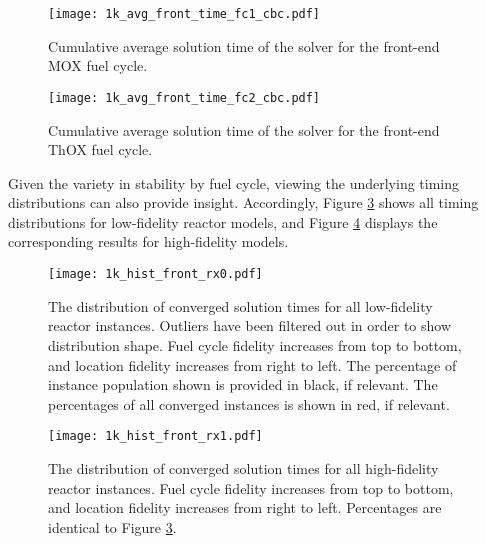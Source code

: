 \begin{figure}[h!]
  \begin{center}
    \texttt{[image: 1k\_avg\_front\_time\_fc1\_cbc.pdf]}
    \caption{
      \label{fig:1k_avg_front_time_fc1_cbc}
      Cumulative average solution time of the \cbc solver for the front-end MOX
      fuel cycle.}
  \end{center}
\end{figure}

\begin{figure}[h!]
  \begin{center}
    \texttt{[image: 1k\_avg\_front\_time\_fc2\_cbc.pdf]}
    \caption{
      \label{fig:1k_avg_front_time_fc2_cbc}
      Cumulative average solution time of the \cbc solver for the front-end ThOX
      fuel cycle.}
  \end{center}
\end{figure}

Given the variety in stability by fuel cycle, viewing the underlying timing
distributions can also provide insight. Accordingly, Figure
\ref{fig:1k_hist_front_rx0} shows all timing distributions for low-fidelity
reactor models, and Figure \ref{fig:1k_hist_front_rx1} displays the
corresponding results for high-fidelity models.

\begin{figure}[h!]
  \begin{center}
    \texttt{[image: 1k\_hist\_front\_rx0.pdf]}
    \caption{
      \label{fig:1k_hist_front_rx0}
      The distribution of converged solution times for all low-fidelity reactor
      instances. Outliers have been filtered out in order to show distribution
      shape. Fuel cycle fidelity increases from top to bottom, and location
      fidelity increases from right to left. The percentage of instance
      population shown is provided in black, if relevant. The percentages of all
      converged instances is shown in red, if relevant.}
  \end{center}
\end{figure}

\begin{figure}[h!]
  \begin{center}
    \texttt{[image: 1k\_hist\_front\_rx1.pdf]}
    \caption{
      \label{fig:1k_hist_front_rx1}
      The distribution of converged solution times for all high-fidelity reactor
      instances. Fuel cycle fidelity increases from top to bottom, and location
      fidelity increases from right to left. Percentages are identical to Figure
      \ref{fig:1k_hist_front_rx0}.}
  \end{center}
\end{figure}

